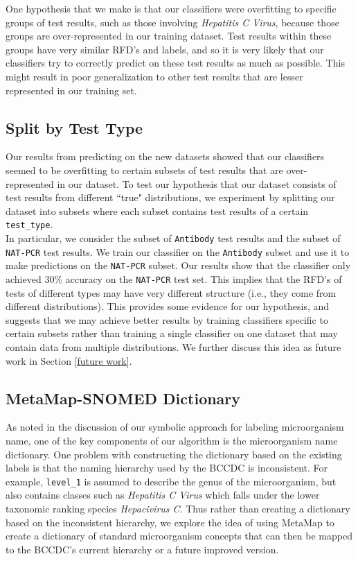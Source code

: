 \documentclass[11pt]{article}
\begin{document}
One hypothesis that we make is that our classifiers were overfitting to specific groups of test results, such as those involving \textit{Hepatitis C Virus}, because those groups are over-represented in our training dataset. Test results within these groups have very similar RFD's and labels, and so it is very likely that our classifiers try to correctly predict on these test results as much as possible. This might result in poor generalization to other test results that are lesser represented in our training set.


\subsection{Split by Test Type} \label{split by test type}

Our results from predicting on the new datasets showed that our classifiers seemed to be overfitting to certain subsets of test results that are over-represented in our dataset. To test our hypothesis that our dataset consists of test results from different ``true" distributions, we experiment by splitting our dataset into subsets where each subset contains test results of a certain \verb|test_type|.
\\

In particular, we consider the subset of \verb|Antibody| test results and the subset of \verb|NAT-PCR| test results. We train our classifier on the \verb|Antibody| subset and use it to make predictions on the \verb|NAT-PCR| subset. Our results show that the classifier only achieved 30\% accuracy on the \verb|NAT-PCR| test set. This implies that the RFD's of tests of different types may have very different structure (i.e., they come from different distributions). This provides some evidence for our hypothesis, and suggests that we may achieve better results by training classifiers specific to certain subsets rather than training a single classifier on one dataset that may contain data from multiple distributions. We further discuss this idea as future work in Section \ref{future work}.


\subsection{MetaMap-SNOMED Dictionary} \label{metamap-snomed dictionary}

As noted in the discussion of our symbolic approach for labeling microorganism name, one of the key components of our algorithm is the microorganism name dictionary. One problem with constructing the dictionary based on the existing labels is that the naming hierarchy used by the BCCDC is inconsistent. For example, \verb|level_1| is assumed to describe the genus of the microorganism, but also contains classes such as \textit{Hepatitis C Virus} which falls under the lower taxonomic ranking species \textit{Hepacivirus C}. Thus rather than creating a dictionary based on the inconsistent hierarchy, we explore the idea of using MetaMap to create a dictionary of standard microorganism concepts that can then be mapped to the BCCDC's current hierarchy or a future improved version.
\\
\end{document}
